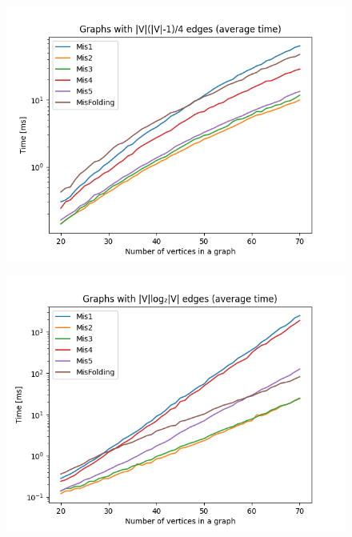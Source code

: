 \begin{figure}[H]
\includegraphics[width=\textwidth]{4_benchmark/plots/0.25n2.png}
\centering
\end{figure}

\begin{figure}[H]
\includegraphics[width=\textwidth]{4_benchmark/plots/1nlogn.png}
\centering
\end{figure}


